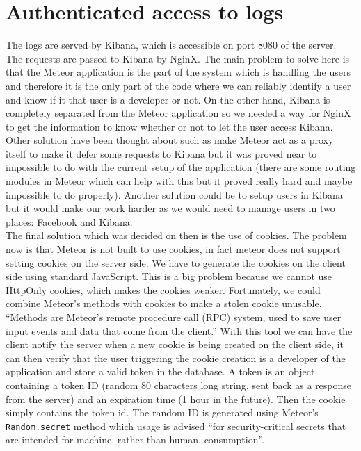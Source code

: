 \appendix
\chapter{Authenticated access to logs}\label{appendix:cookies}
The logs are served by Kibana, which is accessible on port 8080 of the server. The requests are passed to Kibana by NginX. The main problem to solve here is that the Meteor application is the part of the system which is handling the users and therefore it is the only part of the code where we can reliably identify a user and know if it that user is a developer or not. On the other hand, Kibana is completely separated from the Meteor application so we needed a way for NginX to get the information to know whether or not to let the user access Kibana.\\
Other solution have been thought about such as make Meteor act as a proxy itself to make it defer some requests to Kibana but it was proved near to impossible to do with the current setup of the application (there are some routing modules in Meteor which can help with this but it proved really hard and maybe impossible to do properly). Another solution could be to setup users in Kibana but it would make our work harder as we would need to manage users in two places: Facebook and Kibana.\\
The final solution which was decided on then is the use of cookies. The problem now is that Meteor is not built to use cookies, in fact meteor does not support setting cookies on the server side. We have to generate the cookies on the client side using standard JavaScript. This is a big problem because we cannot use HttpOnly cookies\cite{httponly}, which makes the cookies weaker. Fortunately, we could combine Meteor's methods with cookies to make a stolen cookie unusable.\\
``Methods are Meteor’s remote procedure call (RPC) system, used to save user input events and data that come from the client.'' \cite{methods} With this tool we can have the client notify the server when a new cookie is being created on the client side, it can then verify that the user triggering the cookie creation is a developer of the application and store a valid token in the database. A token is an object containing a token ID (random 80 characters long string, sent back as a response from the server) and an expiration time (1 hour in the future). Then the cookie simply contains the token id. The random ID is generated using Meteor's \texttt{Random.secret} method which usage is advised ``for security-critical secrets that are intended for machine, rather than human, consumption''\cite{meteorrandom}.\\
